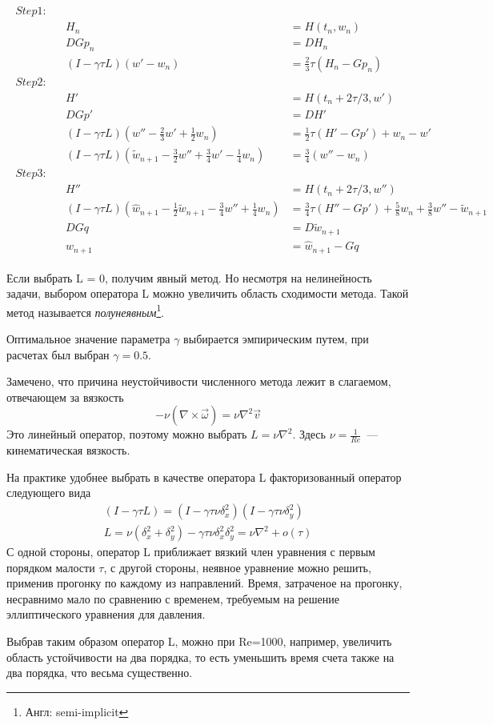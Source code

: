 \begin{gather}
\begin{align*}
Step 1:& \\
&&H_n &= H(t_n, w_n) \\
&&DGp_n &= DH_n \\
&&(I - \gamma \tau L)(w' - w_n) &= \frac{2}{3} \tau (H_n - Gp_n) \\
%
Step 2:& \\
&&H' &= H(t_n + 2\tau/3, w') \\
&&DGp' &= DH' \\
&&(I - \gamma \tau L)(w'' - \frac{2}{3}w' + \frac{1}{2}w_n) &= \frac{1}{2} \tau (H' - Gp') + w_n - w' \\
&&(I - \gamma \tau L)(\tilde w_{n+1} - \frac{3}{2}w'' + \frac{3}{4}w' - \frac{1}{4}w_n) &= \frac{3}{4}(w'' - w_n)\\
%
Step 3:& \\
&&H'' &= H(t_n + 2\tau/3, w'') \\
&&(I - \gamma \tau L)(\hat w_{n+1} - \frac{1}{2} \tilde w_{n+1} - \frac{3}{4}w'' + \frac{1}{4}w_n) &= \frac{3}{4} \tau (H'' - Gp') + 
	\frac{5}{8}w_n + \frac{3}{8}w'' - \tilde w_{n+1} \\
&&DGq &= D\tilde w_{n+1} \\
&&w_{n+1} &= \hat w_{n+1} - Gq
\end{align*}
\end{gather}

Если выбрать L = 0, получим явный метод. Но несмотря на нелинейность задачи, выбором оператора L можно увеличить область сходимости метода. Такой метод называется \textit{полунеявным}\footnote{Англ: semi-implicit}. 

Оптимальное значение параметра $\gamma$ выбирается эмпирическим путем, при расчетах был выбран $\gamma=0.5$. 

Замечено, что причина неустойчивости численного метода лежит в слагаемом, отвечающем за вязкость$$
	- \nu (\nabla \times \vec \omega) = \nu \nabla ^2 \vec v
$$ Это линейный оператор, поэтому можно выбрать $L = \nu \nabla^2$. Здесь $\nu = \frac{1}{Re}$~--- кинематическая вязкость. 

На практике удобнее выбрать в качестве оператора L факторизованный оператор следующего вида
\begin{gather*}
	(I - \gamma \tau L) = (I - \gamma \tau \nu \delta_x^2)(I - \gamma \tau \nu \delta_y^2) \\
	L =  \nu (\delta_x^2 + \delta_y^2) - \gamma \tau \nu \delta_x^2 \delta_y^2 = \nu \nabla^2 + o(\tau)
\end{gather*}
С одной стороны, оператор L приближает вязкий член уравнения с первым порядком малости $\tau$, с другой стороны, неявное уравнение можно решить, применив прогонку по каждому из направлений. Время, затраченое на прогонку, несравнимо мало по сравнению с временем, требуемым на решение эллиптического уравнения для давления. 

Выбрав таким образом оператор L, можно при Re=1000, например, увеличить область устойчивости на два порядка, то есть уменьшить время счета также на два порядка, что весьма существенно. 



